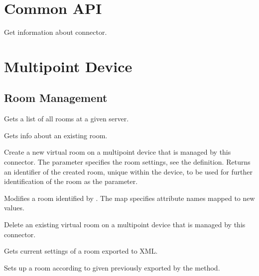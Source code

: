 \section{Common API}

\begin{Api}

Get information about connector.

\end{Api}

\section{Multipoint Device} \label{sect:connector-api-multipoint}

\subsection{Room Management}
\begin{Api}

Gets a list of all rooms at a given server.

Gets info about an existing room.

Create a new virtual room on a multipoint device that is managed by this connector. The  parameter specifies the room settings, see the  definition. Returns an identifier of the created room, unique within the device, to be used for further identification of the room as the  parameter.

Modifies a room identified by . The  map specifies  attribute names mapped to new values.

Delete an existing virtual room on a multipoint device that is managed by this connector.

Gets current settings of a room exported to XML.
\\

Sets up a room according to given  previously exported by the  method.

\end{Api}


